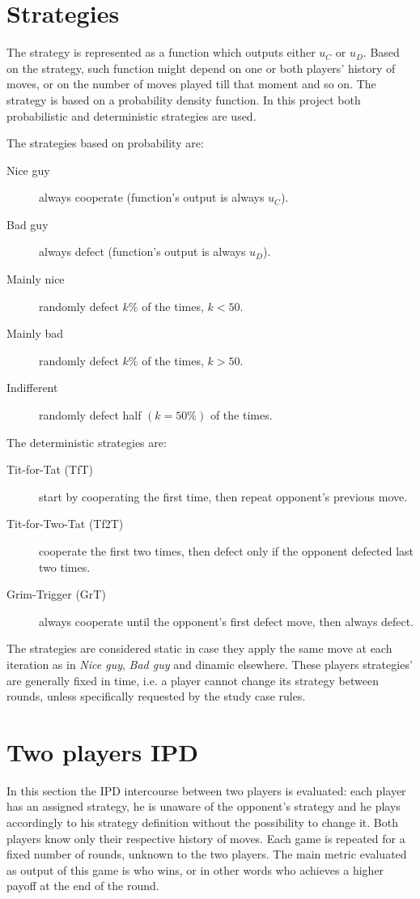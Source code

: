 \documentclass[journal,a4paper,10pt,twoside]{IEEEtran} %
\begin{document}
\section{Strategies} \label{s:str}
The strategy is represented as a function which outputs either $u_C$ or $u_D$. Based on the strategy, such function might depend on one or both players' history of moves, or on the number of moves played till that moment and so on.
The strategy is based on a probability density function. In this project both probabilistic and deterministic strategies are used.

The strategies based on probability are:
\begin{description}
    \item[Nice guy] always cooperate (function's output is always $u_C$).
    \item[Bad guy] always defect (function's output is always $u_D$).
    \item[Mainly nice] randomly defect $k\%$ of the times, $k<50$.%
    \item[Mainly bad] randomly defect $k\%$ of the times, $k>50$.%
    \item[Indifferent] randomly defect half $(k=50\%)$ of the times.
\end{description}

The deterministic strategies are:
\begin{description}
    \item[Tit-for-Tat (TfT)] start by cooperating the first time, then repeat opponent's previous move.
    \item[Tit-for-Two-Tat (Tf2T)] cooperate the first two times, then defect only if the opponent defected last two times.
    \item[Grim-Trigger (GrT)] always cooperate until the opponent's first defect move, then always defect. 
\end{description}

The strategies are considered static in case they apply the same move at each iteration as in \textit{Nice guy}, \textit{Bad guy} and dinamic elsewhere.
These players strategies' are generally fixed in time, i.e. a player cannot change its strategy between rounds, unless specifically requested by the study case rules.%

\section{Two players IPD} \label{s:IPD2P}
In this section the IPD intercourse between two players is evaluated: each player has an assigned strategy, he is unaware of the opponent's strategy and he plays accordingly to his strategy definition without the possibility to change it. Both players know only their respective history of moves. Each game is repeated for a fixed number of rounds, unknown to the two players. The main metric evaluated as output of this game is who wins, or in other words who achieves a higher payoff at the end of the round.
\end{document}
